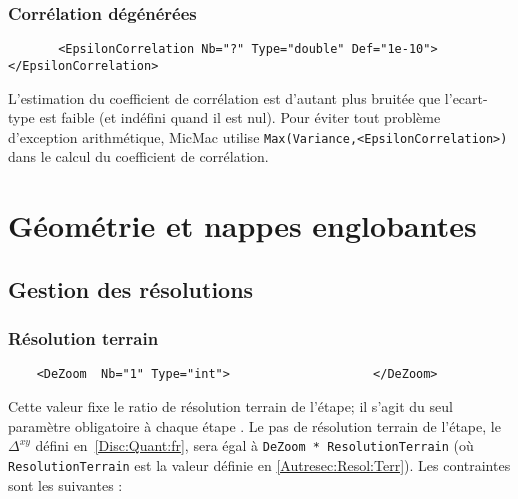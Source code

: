 
\subsubsection{Corr\'elation d\'eg\'en\'er\'ees}

\begin{verbatim}
       <EpsilonCorrelation Nb="?" Type="double" Def="1e-10"> </EpsilonCorrelation>
\end{verbatim}

L'estimation du coefficient de corr\'elation  est d'autant
plus bruit\'ee  que l'ecart-type est faible (et ind\'efini
quand il est nul).  Pour \'eviter tout probl\`eme d'exception
arithm\'etique, MicMac utilise  {\tt Max(Variance,<EpsilonCorrelation>)}
dans le calcul du coefficient de corr\'elation.


\section{G\'eom\'etrie et  nappes englobantes}


\subsection{Gestion des r\'esolutions}

\subsubsection{R\'esolution terrain}
\begin{verbatim}
    <DeZoom  Nb="1" Type="int">                    </DeZoom>
\end{verbatim}

Cette valeur fixe le ratio de r\'esolution terrain de l'\'etape;
il s'agit du seul param\`etre obligatoire \`a chaque \'etape .
Le pas de r\'esolution terrain de l'\'etape, le $\Delta^{xy}$
 d\'efini en~\ref{Disc:Quant:fr},
sera \'egal \`a {\tt DeZoom * ResolutionTerrain} (o\`u
{\tt ResolutionTerrain} est la valeur d\'efinie en \ref{Autresec:Resol:Terr}).
 Les contraintes sont les suivantes :


